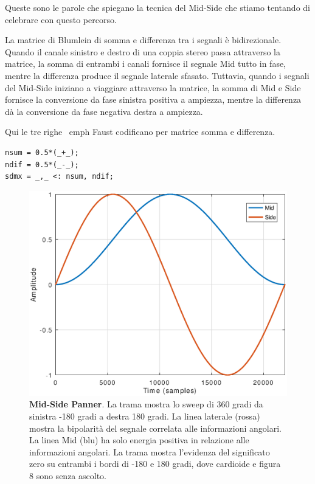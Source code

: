Queste sono le parole che spiegano la tecnica del Mid-Side che stiamo tentando
di celebrare con questo percorso.

La matrice di Blumlein di somma e differenza tra i segnali è bidirezionale.
Quando il canale sinistro e destro di una coppia stereo passa attraverso la
matrice, la somma di entrambi i canali fornisce il segnale Mid tutto in fase,
mentre la differenza produce il segnale laterale sfasato. Tuttavia, quando i
segnali del Mid-Side iniziano a viaggiare attraverso la matrice, la somma di Mid
e Side fornisce la conversione da fase sinistra positiva a ampiezza, mentre la
differenza dà la conversione da fase negativa destra a ampiezza.

Qui le tre righe \ emph {Faust} codificano per matrice somma e differenza.%

\begin{lstlisting}
nsum = 0.5*(_+_);
ndif = 0.5*(_-_);
sdmx = _,_ <: nsum, ndif;
\end{lstlisting}

\vfill

\begin{figure}[h]
\centering
\includegraphics[width=1\columnwidth]{CAPITOLI/1000/IMG/mspan}
\caption{\textbf{Mid-Side Panner}. La trama mostra lo sweep di 360 gradi da
sinistra -180 gradi a destra 180 gradi. La linea laterale (rossa) mostra la
bipolarità del segnale correlata alle informazioni angolari. La linea Mid (blu)
ha solo energia positiva in relazione alle informazioni angolari. La trama
mostra l'evidenza del significato zero su entrambi i bordi di -180 e 180 gradi,
dove cardioide e figura 8 sono senza ascolto.}
\label{fig:mspan}
\end{figure}

